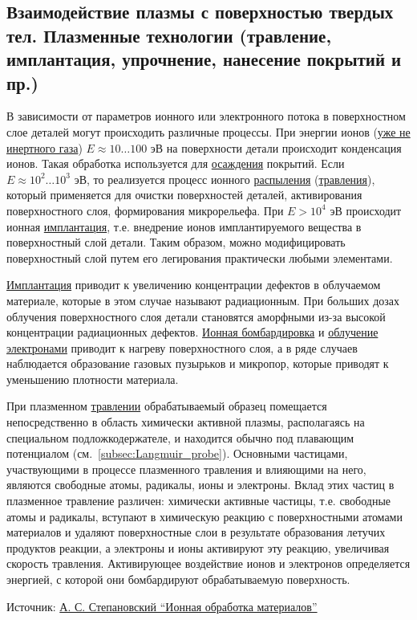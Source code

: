 \documentclass[10pt, a4paper]{article}
\begin{document}
\subsection{Взаимодействие плазмы с поверхностью твердых тел. Плазменные технологии (травление, имплантация, упрочнение, нанесение покрытий и пр.)}

В зависимости от параметров ионного или электронного потока в поверхностном слое деталей могут происходить различные процессы. При энергии ионов (\uline{уже не инертного газа}) $E \approx 10\ldots 100$ эВ на поверхности детали происходит конденсация ионов. Такая обработка используется для \uline{осаждения} покрытий. Если $E \approx 10^2\ldots10^3$ эВ, то реализуется процесс ионного \uline{распыления} (\uline{травления}), который применяется для очистки поверхностей деталей, активирования поверхностного слоя, формирования микрорельефа. При $E > 10^4$ эВ происходит ионная \uline{имплантация}, т.е. внедрение ионов имплантируемого вещества в поверхностный слой детали. Таким образом, можно модифицировать поверхностный слой путем его легирования практически любыми элементами.

\uline{Имплантация} приводит к увеличению концентрации дефектов в облучаемом материале, которые в этом случае называют радиационным. При больших дозах облучения поверхностного слоя детали становятся аморфными из-за высокой концентрации радиационных дефектов. \uline{Ионная бомбардировка} и \uline{облучение электронами} приводит к нагреву поверхностного слоя, а в ряде случаев наблюдается образование газовых пузырьков и микропор, которые приводят к уменьшению плотности материала.

При плазменном \uline{травлении} обрабатываемый образец помещается непосредственно в область химически активной плазмы, располагаясь на специальном подложкодержателе, и находится обычно под плавающим потенциалом (см.~\ref{subsec:Langmuir_probe}). Основными частицами, участвующими в процессе плазменного травления и влияющими на него, являются свободные атомы, радикалы, ионы и электроны. Вклад этих частиц в плазменное травление различен: химически активные частицы, т.е. свободные атомы и радикалы, вступают в химическую реакцию с поверхностными атомами материалов и удаляют поверхностные слои в результате образования летучих продуктов реакции, а электроны и ионы активируют эту реакцию, увеличивая скорость травления. Активирующее воздействие ионов и электронов определяется энергией, с которой они бомбардируют обрабатываемую поверхность.

Источник: \href{http://journal.mrsu.ru/wp-content/uploads/2014/01/Stepanovskijj.pdf}{А. С. Степановский ``Ионная обработка материалов''}
\end{document}
